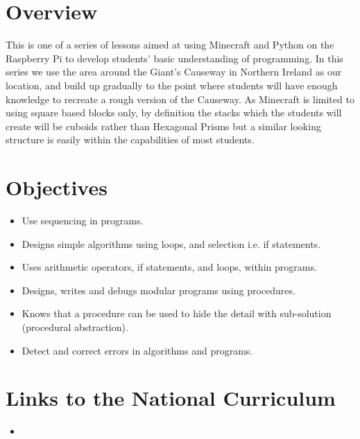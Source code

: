 \documentclass{geocraft-lesson-plan}
\begin{document}
\subtitle{Part 4 - Functions}

\section*{Overview} This is one of a series of lessons aimed at using Minecraft and Python on the Raspberry Pi to
develop students' basic understanding of programming. In this series we use the area around the Giant's Causeway in
Northern Ireland as our location, and build up gradually to the point where students will have enough knowledge to
recreate a rough version of the Causeway. As Minecraft is limited to using square based blocks only, by definition the
stacks which the students will create will be cuboids rather than Hexagonal Prisms but a similar looking structure is
easily within the capabilities of most students.

\section*{Objectives}
\begin{itemize}
\item Use sequencing in programs.
\item Designs simple algorithms using loops, and selection i.e. if statements.
\item Uses arithmetic operators, if statements, and loops, within programs.
\item Designs, writes and debugs modular programs using procedures.
\item Knows that a procedure can be used to hide the detail with sub-solution (procedural abstraction).
\item Detect and correct errors in algorithms and programs.
\end{itemize}



\section*{Links to the National Curriculum}
\begin{itemize}
\item 
\end{itemize}
\end{document}
